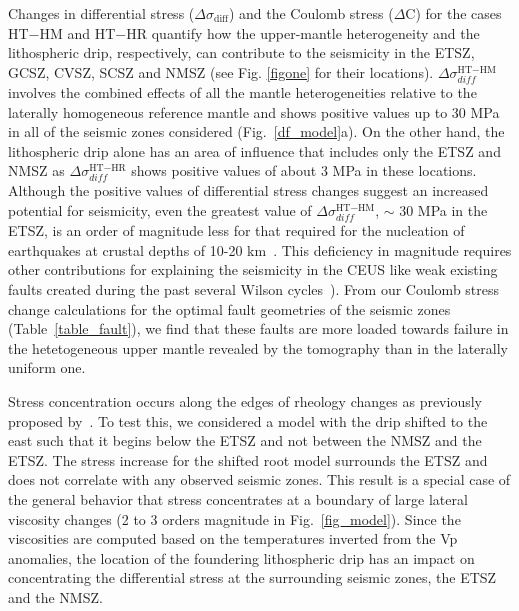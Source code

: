 \documentclass[draft,linenumbers]{agujournal2018}
\begin{document}
Changes in differential stress ($\Delta \sigma_{\text{diff}}$) and the Coulomb stress ($\Delta$C) for the cases HT$-$HM and HT$-$HR quantify how the upper-mantle heterogeneity and the lithospheric drip, respectively, can contribute to the seismicity in the ETSZ, GCSZ, CVSZ, SCSZ and NMSZ (see Fig. \ref{figone} for their locations).
$\Delta\sigma_{diff}^{\text{HT}-\text{HM}}$ involves the combined effects of all the mantle heterogeneities relative to the laterally homogeneous reference mantle and shows positive values up to 30 MPa in all of the seismic zones considered (Fig.~\ref{df_model}a). On the other hand, the lithospheric drip alone has an area of influence that includes only the ETSZ and NMSZ as $\Delta\sigma_{diff}^{\text{HT}-\text{HR}}$ %
shows positive values of about 3 MPa in these locations. Although the positive values of differential stress changes suggest an increased potential for seismicity, even the greatest value of $\Delta\sigma_{diff}^{\text{HT}-\text{HM}}$, $\sim$ 30 MPa in the ETSZ, is an order of magnitude less for that required for the nucleation of earthquakes at crustal depths of 10-20 km~\citep[e.g.][]{sibson1990rupture}. This deficiency in magnitude requires other contributions for explaining the seismicity in the CEUS like weak existing faults created during the past several Wilson cycles~\citep{thomas2006tectonic}). From our Coulomb stress change calculations for the optimal fault geometries of the seismic zones (Table~\ref{table_fault}), we find that these faults are more loaded towards failure  in the hetetogeneous upper mantle revealed by the tomography than in the laterally uniform one.
       
Stress concentration occurs along the edges of rheology changes as previously proposed by~\citet{zhang2009tomographic}. To test this, we considered a model with the drip shifted to the east such that it begins below the ETSZ and not between the NMSZ and the ETSZ. The stress increase for the shifted root model surrounds the ETSZ and does not correlate with any observed seismic zones. This result is a special case of the general behavior that stress concentrates at a boundary of large lateral viscosity changes (2 to 3 orders magnitude in Fig.~\ref{fig_model}). Since the viscosities are computed based on the temperatures inverted from the Vp anomalies, the location of the foundering lithospheric drip has an impact on concentrating the differential stress at the surrounding seismic zones, the ETSZ and the NMSZ. 
    
\end{document}
